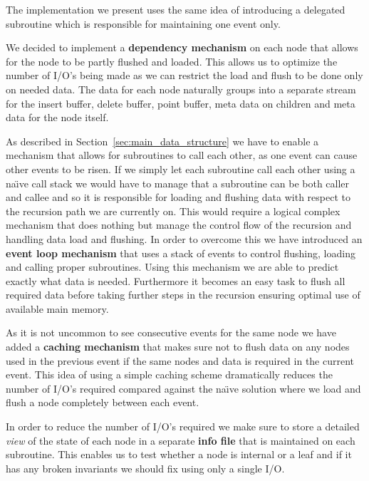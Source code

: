 \documentclass[twoside,11pt,openright]{report}
\begin{document}
The implementation we present uses the same idea of introducing a delegated subroutine which is responsible for maintaining one event only.

We decided to implement a \textbf{dependency mechanism} on each node that allows for the node to be partly flushed and loaded. This allows us to optimize the number of I/O's being made as we can restrict the load and flush to be done only on needed data. The data for each node naturally groups into a separate stream for the insert buffer, delete buffer, point buffer, meta data on children and meta data for the node itself. %

As described in Section~\ref{sec:main_data_structure} we have to enable a mechanism that allows for subroutines to call each other, as one event can cause other events to be risen. If we simply let each subroutine call each other using a na\"{\i}ve call stack we would have to manage that a subroutine can be both caller and callee and so it is responsible for loading and flushing data with respect to the recursion path we are currently on. This would require a logical complex mechanism that does nothing but manage the control flow of the recursion and handling data load and flushing. In order to overcome this we have introduced an \textbf{event loop mechanism} that uses a stack of events to control flushing, loading and calling  proper subroutines. Using this mechanism we are able to predict exactly what data is needed. Furthermore it becomes an easy task to flush all required data before taking further steps in the recursion ensuring optimal use of available main memory.

As it is not uncommon to see consecutive events for the same node we have added a \textbf{caching mechanism} that makes sure not to flush data on any nodes used in the previous event if the same nodes and data is required in the current event. This idea of using a simple caching scheme dramatically reduces the number of I/O's required compared against the na\"{\i}ve solution where we load and flush a node completely between each event.

In order to reduce the number of I/O's required we make sure to store a detailed \textit{view} of the state of each node in a separate \textbf{info file} that is maintained on each subroutine. This enables us to test whether a node is internal or a leaf and if it has any broken invariants we should fix using only a single I/O.
\end{document}
